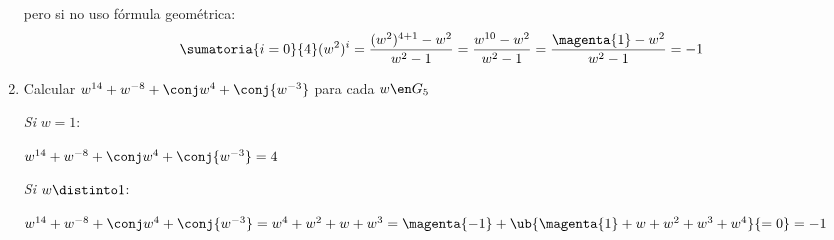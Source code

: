 \begin{enumerate}[label=\alph*)]
          pero si no uso fórmula geométrica:
        $$
        \sumatoria{i = 0}{4} (w^2)^i  =
        \frac{(w^2)^{4 + 1} - w^2}{w^2 - 1} =
        \frac{w^{10} - w^2}{w^2 - 1} =
        \frac{\magenta{1} - w^2}{w^2 - 1} = -1
        $$

  \item Calcular $w^{14} + w^{-8} + \conj w^4 + \conj{w^{-3}}$ para cada $w \en G_5$

        \separadorCorto
        \textit{Si} $w = 1$: \par
        $w^{14} + w^{-8} + \conj w^4 + \conj{w^{-3}} = 4$

        \textit{Si} $w \distinto 1$: \par
        $w^{14} + w^{-8} + \conj w^4 + \conj{w^{-3}} =
          w^4 + w^2 + w + w^3 =
          \magenta{-1} + \ub{\magenta{1} + w + w^2 + w^3 + w^4}{= 0} = -1 $

\end{enumerate}
